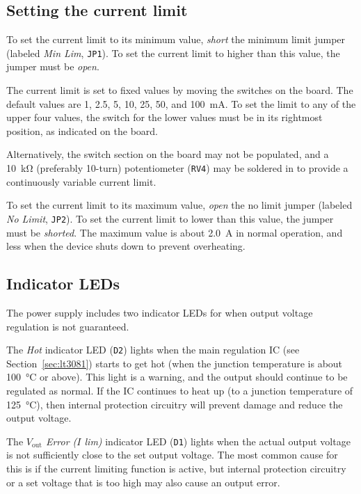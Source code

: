 \documentclass[letterpaper,twocolumn,11pt]{article}
\newcommand{\refdes}[1]{\texttt{#1}}
\begin{document}
\subsection{Setting the current limit}\label{sec:set_limit}

To set the current limit to its minimum value, \emph{short} the minimum limit
jumper (labeled \emph{Min Lim}, \refdes{JP1}). To set the current limit to
higher than this value, the jumper must be \emph{open}.

The current limit is set to fixed values by moving the switches on the
board. The default values are 1, 2.5, 5, 10, 25, 50, and \SI{100}{\mA}. To set
the limit to any of the upper four values, the switch for the lower values must
be in its rightmost position, as indicated on the board.

Alternatively, the switch section on the board may not be populated, and a
\SI{10}{\kohm} (preferably 10-turn) potentiometer (\refdes{RV4}) may be
soldered in to provide a continuously variable current limit.

To set the current limit to its maximum value, \emph{open} the no limit jumper
(labeled \emph{No Limit}, \refdes{JP2}). To set the current limit to lower than
this value, the jumper must be \emph{shorted}. The maximum value is about
\SI{2.0}{\A} in normal operation, and less when the device shuts down to prevent
overheating.

\subsection{Indicator LEDs}

The power supply includes two indicator LEDs for when output voltage regulation
is not guaranteed.

The \textit{Hot} indicator LED (\refdes{D2}) lights when the main regulation IC
(see Section~\ref{sec:lt3081}) starts to get hot (when the junction temperature
is about \SI{100}{\celsius} or above). This light is a warning, and the output
should continue to be regulated as normal. If the IC continues to heat up (to a
junction temperature of \SI{125}{\celsius}), then internal protection circuitry
will prevent damage and reduce the output voltage.

The \textit{$V_\text{out}$ Error ($I$ lim)} indicator LED (\refdes{D1}) lights
when the actual output voltage is not sufficiently close to the set output
voltage. The most common cause for this is if the current limiting function is
active, but internal protection circuitry or a set voltage that is too high may
also cause an output error.
\end{document}
